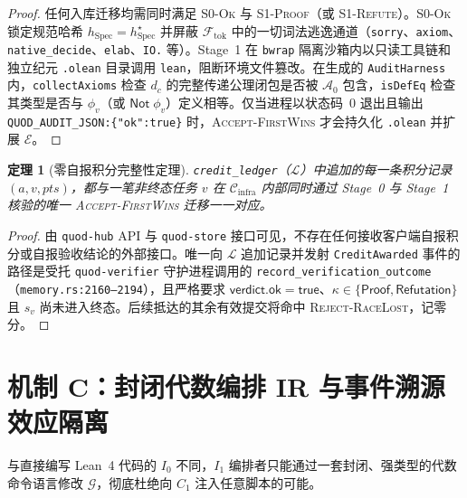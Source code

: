 \documentclass[10pt,a4paper,fontset=fandol]{ctexart}
\newtheorem{theorem}{定理}[section]
\newcommand{\Cinfra}{\mathcal{C}_{\mathrm{infra}}}
\newcommand{\Truth}{\mathcal{E}}
\newcommand{\Orch}{\mathcal{G}}
\newcommand{\Ledger}{\mathcal{L}}
\newcommand{\Spec}{\mathrm{Spec}}
\newcommand{\AxiomsZero}{\mathcal{A}_0}
\newcommand{\kw}[1]{\mathsf{#1}}
\newcommand{\code}[1]{\texttt{#1}}
\begin{document}
\begin{proof}
任何入库迁移均需同时满足 \textsc{S0-Ok} 与 \textsc{S1-Proof}（或 \textsc{S1-Refute}）。\textsc{S0-Ok} 锁定规范哈希 $h_{\Spec} = h_{\Spec}^{\star}$ 并屏蔽 $\mathcal{F}_{\mathrm{tok}}$ 中的一切词法逃逸通道（\code{sorry}、\code{axiom}、\code{native\_decide}、\code{elab}、\code{IO.} 等）。Stage~1 在 \code{bwrap} 隔离沙箱内以只读工具链和独立纪元 \code{.olean} 目录调用 \code{lean}，阻断环境文件篡改。在生成的 \code{AuditHarness} 内，\code{collectAxioms} 检查 $d_c$ 的完整传递公理闭包是否被 $\AxiomsZero$ 包含，\code{isDefEq} 检查其类型是否与 $\phi_v$（或 $\kw{Not}\;\phi_v$）定义相等。仅当进程以状态码~0 退出且输出 \code{QUOD\_AUDIT\_JSON:\{"ok":true\}} 时，\textsc{Accept-FirstWins} 才会持久化 \code{.olean} 并扩展 $\Truth$。
\end{proof}

\begin{theorem}[零自报积分完整性定理]\label{thm:credit-integrity}
\code{credit\_ledger}（$\Ledger$）中追加的每一条积分记录 $(a, v, pts)$，都与一笔非终态任务 $v$ 在 $\Cinfra$ 内部同时通过 Stage~0 与 Stage~1 核验的唯一 \textsc{Accept-FirstWins} 迁移一一对应。
\end{theorem}

\begin{proof}
由 \code{quod-hub} API 与 \code{quod-store} 接口可见，不存在任何接收客户端自报积分或自报验收结论的外部接口。唯一向 $\Ledger$ 追加记录并发射 \code{CreditAwarded} 事件的路径是受托 \code{quod-verifier} 守护进程调用的 \code{record\_\-verification\_\-outcome}（\code{memory.rs:2160--2194}），且严格要求 $\kw{verdict.ok} = \kw{true}$、$\kappa \in \{\kw{Proof}, \kw{Refutation}\}$ 且 $s_v$ 尚未进入终态。后续抵达的其余有效提交将命中 \textsc{Reject-RaceLost}，记零分。
\end{proof}

\section{机制 C：封闭代数编排 IR 与事件溯源效应隔离}\label{sec:mech-c}

与直接编写 Lean~4 代码的 $I_0$ 不同，$I_1$ 编排者只能通过一套封闭、强类型的代数命令语言修改 $\Orch$，彻底杜绝向 $C_1$ 注入任意脚本的可能。
\end{document}
